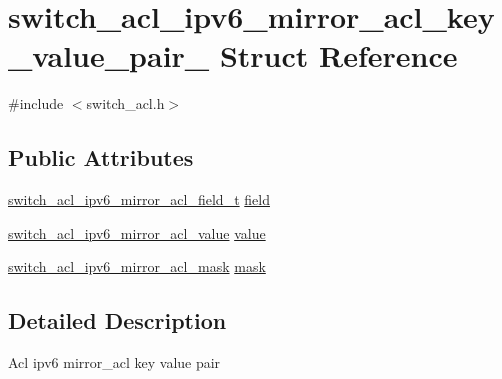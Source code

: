 \hypertarget{structswitch__acl__ipv6__mirror__acl__key__value__pair__}{\section{switch\+\_\+acl\+\_\+ipv6\+\_\+mirror\+\_\+acl\+\_\+key\+\_\+value\+\_\+pair\+\_\+ Struct Reference}
\label{structswitch__acl__ipv6__mirror__acl__key__value__pair__}
}


{\ttfamily \#include $<$switch\+\_\+acl.\+h$>$}

\subsection*{Public Attributes}
\begin{DoxyCompactItemize}
\item 
\hyperlink{group__ACL_gaae7e0c4f916d7237b7ebbdd8d6608110}{switch\+\_\+acl\+\_\+ipv6\+\_\+mirror\+\_\+acl\+\_\+field\+\_\+t} \hyperlink{structswitch__acl__ipv6__mirror__acl__key__value__pair___a75ddd30627b37b6a72b21e92d73e4f32}{field}
\item 
\hyperlink{group__ACL_gaaab3094c60472f1d2498b7da60715bd7}{switch\+\_\+acl\+\_\+ipv6\+\_\+mirror\+\_\+acl\+\_\+value} \hyperlink{structswitch__acl__ipv6__mirror__acl__key__value__pair___a9a63c119ffe07f6ffd5bf5a076230606}{value}
\item 
\hyperlink{group__ACL_ga12e6b294beab0f491c464b9039e8637c}{switch\+\_\+acl\+\_\+ipv6\+\_\+mirror\+\_\+acl\+\_\+mask} \hyperlink{structswitch__acl__ipv6__mirror__acl__key__value__pair___a7492204a7834b7b7da1868ef003e0346}{mask}
\end{DoxyCompactItemize}


\subsection{Detailed Description}
Acl ipv6 mirror\+\_\+acl key value pair 


